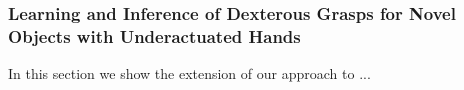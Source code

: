 
\subsubsection{Learning and Inference of Dexterous Grasps for Novel Objects with Underactuated Hands}
\label{sec:LearningInferenceUnderactuatedHands}

In this section we show the extension of our approach to ...
